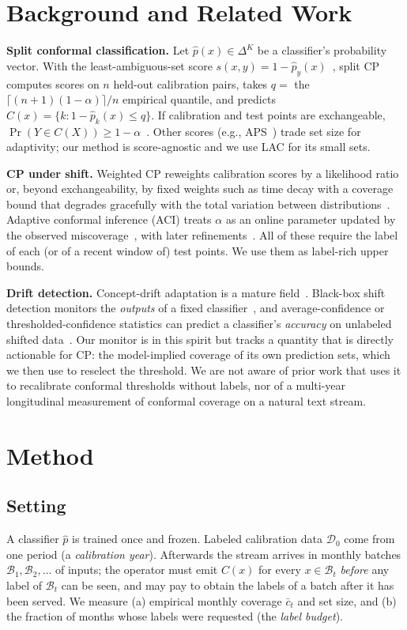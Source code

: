 \documentclass[conference]{IEEEtran}
\begin{document}
\section{Background and Related Work}
\textbf{Split conformal classification.} Let $\hat p(x)\in\Delta^{K}$ be a classifier's probability vector. With the least-ambiguous-set score $s(x,y)=1-\hat p_y(x)$~\cite{sadinle2019least}, split CP computes scores on $n$ held-out calibration pairs, takes $q=$ the $\lceil (n{+}1)(1{-}\alpha)\rceil/n$ empirical quantile, and predicts $C(x)=\{k: 1-\hat p_k(x)\le q\}$. If calibration and test points are exchangeable, $\Pr(Y\in C(X))\ge 1-\alpha$~\cite{vovk2005algorithmic}. Other scores (e.g., APS~\cite{romano2020classification}) trade set size for adaptivity; our method is score-agnostic and we use LAC for its small sets.

\textbf{CP under shift.} Weighted CP reweights calibration scores by a likelihood ratio~\cite{tibshirani2019covariate} or, beyond exchangeability, by fixed weights such as time decay with a coverage bound that degrades gracefully with the total variation between distributions~\cite{barber2023beyond}. Adaptive conformal inference (ACI) treats $\alpha$ as an online parameter updated by the observed miscoverage~\cite{gibbs2021adaptive}, with later refinements~\cite{zaffran2022adaptive,bhatnagar2023improved}. All of these require the label of each (or of a recent window of) test points. We use them as label-rich upper bounds.

\textbf{Drift detection.} Concept-drift adaptation is a mature field~\cite{gama2014survey,lu2019learning}. Black-box shift detection monitors the \emph{outputs} of a fixed classifier~\cite{lipton2018detecting,rabanser2019failing}, and average-confidence or thresholded-confidence statistics can predict a classifier's \emph{accuracy} on unlabeled shifted data~\cite{guillory2021predicting,garg2022leveraging}. Our monitor is in this spirit but tracks a quantity that is directly actionable for CP: the model-implied coverage of its own prediction sets, which we then use to reselect the threshold. We are not aware of prior work that uses it to recalibrate conformal thresholds without labels, nor of a multi-year longitudinal measurement of conformal coverage on a natural text stream.

\section{Method}
\subsection{Setting}
A classifier $\hat p$ is trained once and frozen. Labeled calibration data $\mathcal{D}_0$ come from one period (a \emph{calibration year}). Afterwards the stream arrives in monthly batches $\mathcal{B}_1,\mathcal{B}_2,\dots$ of inputs; the operator must emit $C(x)$ for every $x\in\mathcal{B}_t$ \emph{before} any label of $\mathcal{B}_t$ can be seen, and may pay to obtain the labels of a batch after it has been served. We measure (a) empirical monthly coverage $\bar{c}_t$ and set size, and (b) the fraction of months whose labels were requested (the \emph{label budget}).
\end{document}
